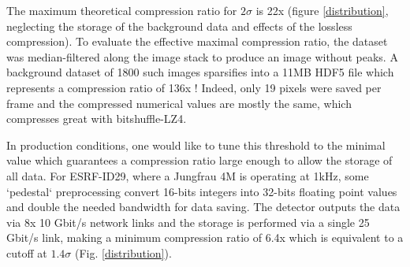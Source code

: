 \documentclass[a4paper,12pt,oneside]{article}              %
\begin{document}
The maximum theoretical compression ratio for $2\sigma$ is 22x (figure \ref{distribution}, neglecting the storage of the background data and effects of the lossless compression).
To evaluate the effective maximal compression ratio, the dataset was median-filtered along the image stack
to produce an image without peaks. 
A background dataset of 1800 such images sparsifies into a 11MB HDF5 file which represents a compression ratio of 136x ! 
Indeed, only 19 pixels were saved per frame and the compressed numerical values are mostly the same, which compresses great with bitshuffle-LZ4.

In production conditions, one would like to tune this threshold to the minimal value which guarantees a compression ratio large enough to allow the storage of all data.
For ESRF-ID29, where a Jungfrau 4M is operating at 1kHz, some `pedestal` preprocessing convert 16-bits integers into 32-bits floating point values and double the needed bandwidth for data saving. 
The detector outputs the data via 8x 10 Gbit/s network links and the storage is performed via  a single  25 Gbit/s link, making a minimum compression ratio of 6.4x which is equivalent to a cutoff at $1.4\sigma$ (Fig. \ref{distribution}).
\end{document}
